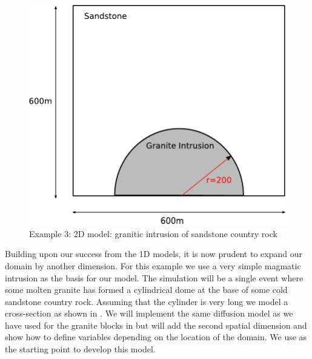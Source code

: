 
%
%
%

\begin{figure}[t]
\centerline{\includegraphics[width=4.in]{figures/twodheatdiff}}
\caption{Example 3: 2D model: granitic intrusion of sandstone country rock}
\label{fig:twodhdmodel}
\end{figure}


Building upon our success from the 1D models, it is now prudent to expand our
domain by another dimension. 
For this example we use a very simple magmatic intrusion as the basis for our
model. The simulation will be a single event where some molten granite has
formed a cylindrical dome at the base of some cold sandstone country rock.
Assuming that the cylinder is very long
we model a cross-section as shown in . We will implement
the same 
diffusion model as we have used for the granite blocks in 
but will add the second spatial dimension and show how to define 
variables depending on the location of the domain. 
We use  as the starting point to develop this model. 

